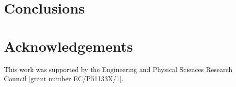 \documentclass[format=acmsmall]{acmart}
\begin{document}
\section{Conclusions}
\label{sec:conclusion}



\section{Acknowledgements}
This work was supported by the Engineering and Physical Sciences Research Council [grant number EC/P51133X/1].
%



%
%
\end{document}
